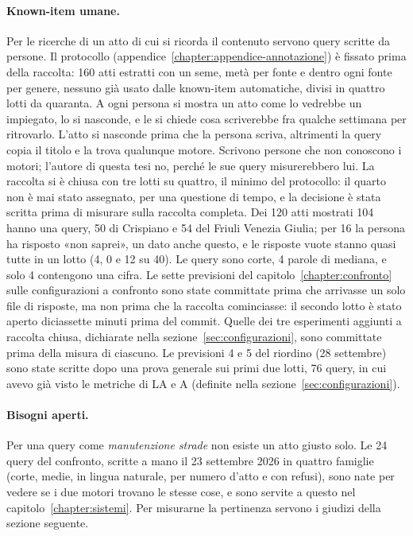 \paragraph{Known-item umane.} Per le ricerche di un atto di cui si ricorda il
contenuto servono query scritte da persone. Il protocollo
(appendice~\ref{chapter:appendice-annotazione}) è fissato prima della raccolta: 160 atti
estratti con un seme, metà per fonte e dentro ogni fonte per genere, nessuno già
usato dalle known-item automatiche, divisi in quattro lotti da quaranta. A ogni
persona si mostra un atto come lo vedrebbe un impiegato, lo si nasconde, e le si
chiede cosa scriverebbe fra qualche settimana per ritrovarlo. L'atto si nasconde
prima che la persona scriva, altrimenti la query copia il titolo e la trova
qualunque motore. Scrivono persone che non conoscono i motori; l'autore di questa
tesi no, perché le sue query misurerebbero lui. La raccolta si è chiusa con
tre lotti su quattro, il minimo del protocollo: il quarto non è mai stato
assegnato, per una questione di tempo, e la decisione è stata scritta prima di
misurare sulla raccolta completa. Dei 120 atti mostrati 104 hanno una query, 50
di Crispiano e 54 del Friuli Venezia Giulia; per 16 la persona ha risposto «non
saprei», un dato anche questo, e le risposte vuote stanno quasi tutte in un
lotto (4, 0 e 12 su 40). Le query sono corte, 4 parole di mediana, e solo 4
contengono una cifra. Le sette previsioni del capitolo~\ref{chapter:confronto} sulle
configurazioni a confronto sono state committate prima che arrivasse un solo file
di risposte, ma non prima che la raccolta cominciasse: il secondo lotto è stato
aperto diciassette minuti prima del commit. Quelle dei tre esperimenti aggiunti a
raccolta chiusa, dichiarate nella sezione~\ref{sec:configurazioni}, sono
committate prima della misura di ciascuno. Le previsioni 4 e 5 del riordino
(28 settembre) sono state scritte dopo una prova generale sui primi due lotti, 76
query, in cui avevo già visto le metriche di LA e A (definite nella
sezione~\ref{sec:configurazioni}).

\paragraph{Bisogni aperti.} Per una query come \emph{manutenzione strade} non
esiste un atto giusto solo. Le 24 query del confronto, scritte a mano il 23
settembre 2026 in quattro famiglie (corte, medie, in lingua naturale, per numero
d'atto e con refusi), sono nate per vedere se i due motori trovano le stesse
cose, e sono servite a questo nel capitolo~\ref{chapter:sistemi}. Per misurarne la
pertinenza servono i giudizi della sezione seguente.

